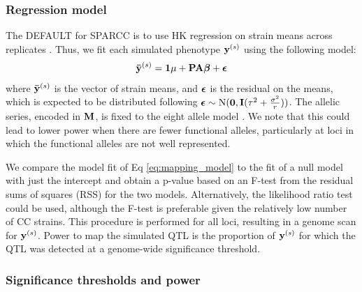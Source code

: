 \subsubsection{Regression model}

The DEFAULT for SPARCC is to use HK regression on strain means across replicates \citep{Zou2006}. Thus, we fit each simulated phenotype $\mathbf{y}^{(s)}$ using the following model:
\begin{equation}
	\mathbf{\bar{y}}^{(s)} = \mathbf{1}\mu + \mathbf{P}\mathbf{A}\boldsymbol{\beta} + \boldsymbol{\epsilon}
    \label{eq:mapping_model}
\end{equation}
where $\mathbf{\bar{y}}^{(s)}$ is the vector of strain means, and $\boldsymbol{\epsilon}$ is the residual on the means, which is expected to be distributed following $\boldsymbol{\epsilon} \sim \text{N}(\mathbf{0}, \mathbf{I}(\tau^{2} + \frac{\sigma^{2}}{r}))$. The allelic series, encoded in $\mathbf{M}$, is fixed to the eight allele model \citep{Gatti2014}. We note that this could lead to lower power when there are fewer functional alleles, particularly at loci in which the functional alleles are not well represented.

We compare the model fit of Eq \ref{eq:mapping_model} to the fit of a null model with just the intercept and obtain a p-value based on an F-test from the residual sums of squares (RSS) for the two models. Alternatively, the likelihood ratio test could be used, although the F-test is preferable given the relatively low number of CC strains. This procedure is performed for all loci, resulting in a genome scan for $\mathbf{y}^{(s)}$. Power to map the simulated QTL is the proportion of $\mathbf{y}^{(s)}$ for which the QTL was detected at a genome-wide significance threshold.

\subsubsection{Significance thresholds and power}

